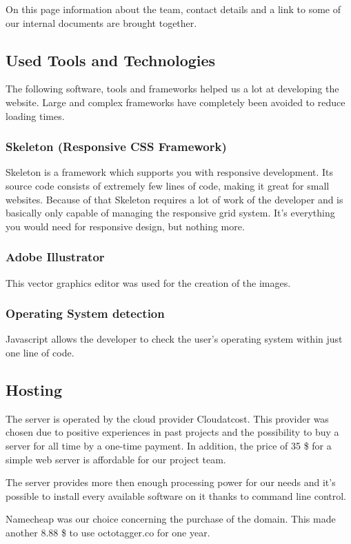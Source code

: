 On this page information about the team, contact details and a link to some of our internal documents are brought together. 

\subsection{Used Tools and Technologies}

The following software, tools and frameworks helped us a lot at developing the website. Large and complex frameworks have completely been avoided to reduce loading times.


\subsubsection{Skeleton (Responsive CSS Framework)}
\label{sec:Skeleton}

Skeleton \cite{Skeleton} is a framework which supports you with responsive development. Its source code consists of extremely few lines of code, making it great for small websites. Because of that Skeleton requires a lot of work of the developer and is basically only capable of managing the responsive grid system. It's everything you would need for responsive design, but nothing more.

\subsubsection{Adobe Illustrator\cite{Illustrator}}

This vector graphics editor was used for the creation of the images. 

\subsubsection{Operating System detection}
\label{sec:OSdetection}

Javascript allows the developer to check the user's operating system within just one line of code.

\subsection{Hosting}

The server is operated by the cloud provider Cloudatcost\cite{Cloudatcost}. This provider was chosen due to positive experiences in past projects and the possibility to buy a server for all time by a one-time payment. In addition, the price of 35 \$ for a simple web server is affordable for our project team. 

The server provides more then enough processing power for our needs and it's possible to install every available software on it thanks to command line control.

Namecheap\cite{Namecheap} was our choice concerning the purchase of the domain. This made another 8.88 \$ to use octotagger.co for one year.
